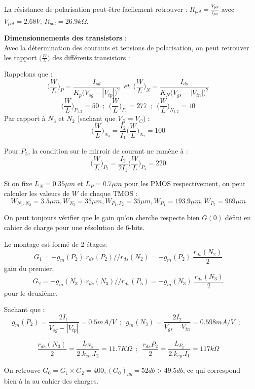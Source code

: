 \documentclass[11pt]{article}
\begin{document}
La r\'esistance de polarisation peut-\^etre facilement retrouver : $R_{pol} = \frac{V_{pol}}{I_{pol}}$
avec $V_{pol} = 2.68 V$, $ R_{pol} = 26.9 k \Omega$.

\textbf{Dimensionnements des transistors} :\\
Avec la d\'etermination des courants et tensions de polarisation, on peut retrouver les
rapport $\Big( \frac{W}{L} \Big)$ des diff\'erents transistors :

Rappelons que :
\[
\bigg( \frac{W}{L} \bigg)_{P} = \frac{I_{sd}}{K_p \big( V_{sg} - |V_{tp}| \big)^{2} }
\phantom{3} et \phantom{3}
\bigg( \frac{W}{L} \bigg)_{N} = \frac{I_{ds}}{K_N \big( V_{gs} - |V_{tn}| \big)^{2} } 
\]
\[
\bigg( \frac{W}{L} \bigg)_{P_{1,2}} = 50
\phantom{3}
;
\phantom{3}
\bigg( \frac{W}{L} \bigg)_{P_{4}} = 277
\phantom{3}
;
\phantom{3}
\bigg( \frac{W}{L} \bigg)_{N_{1,2}} = 10
\]
Par rapport \`a $N_3$ et $N_2$ (sachant que $V_B = V_C$) :
\[
\bigg( \frac{W}{L} \bigg)_{N_{3}} = \frac{I_2}{I_1} \bigg( \frac{W}{L} \bigg)_{N_{2}}  = 100  
\]

Pour $P_5$, la condition sur le mirroir de courant ne ram\`ene \`a :
\[
\bigg( \frac{W}{L} \bigg)_{P_{5}} = \frac{I_2}{2 I_1} \bigg( \frac{W}{L} \bigg)_{P_{4}} = 220
\]

Si on fixe $L_N = 0.35 \mu m$ et $L_P = 0.7 \mu m$ pour les PMOS respectivement, on peut calculer les
valeurs de $W$ de chaque TMOS :
\[
W_{N_1,N_2} = 3.5 \mu m, W_{N_3} = 35 \mu m, W_{P_1, P_2} = 35 \mu m, W_{P_4} = 193.9 \mu m, W_{P_5} = 969 \mu m
\]

On peut toujours v\'erifier que le gain qu'on cherche respecte bien $G(0)$ d\'efini en cahier de charge
pour une r\'esolution de 6-bits.

Le montage est form\'e de 2 \'etages:
\[
G_1 = - g_m (P_2).r_{ds}(P_2)//r_{ds}(N_2) = -g_m(P_2).\frac{r_{ds}(N_2)}{2}
\]
gain du premier,
\[
G_2 = - g_m (N_3).r_{ds}(N_3)//r_{ds}(P_5) = -g_m(N_3).\frac{r_{ds}(N_3)}{2}
\]
pour le deuxi\`eme.

Sachant que :
\[
g_m(P_2) = \frac{2I_1}{V_{sg} - | V_{tp} | } = 0.5  mA/V
\phantom{3}
;
\phantom{3}
g_m(N_3) = \frac{2 I_2}{V_{gs} - V_{tn}} = 0.598 mA/V
\phantom{3}
;
\phantom{3}
\]

\[
\frac{r_{ds}(N_3)}{2} = \frac{L_{N_{3}}}{2.k_{en}.I_{2}} = 11.7 K\Omega
\phantom{3}
;
\phantom{3}
\frac{r_{ds}{P_2}}{2} = \frac{L_{P_{2}}}{2.k_{ep}.I_{1}} = 117 k\Omega
\]

On retrouve $G_0 = G_1 \times G_2 = 400, (G_0)_{db} = 52 db > 49.5 db$, ce qui correspond bien \`a la
au cahier des charges.
\end{document}
